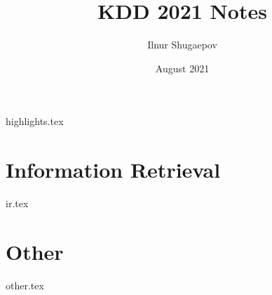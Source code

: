 \documentclass[openany,11pt]{book}
\title{KDD 2021 Notes}
\author{Ilnur Shugaepov}
\date{August 2021}
\begin{document}
\maketitle
\setcounter{tocdepth}{0}
\small{\tableofcontents}
\newpage

{highlights.tex}

\newpage
\part{Information Retrieval}
{ir.tex}

\newpage
\part{Other}
{other.tex}
\end{document}
